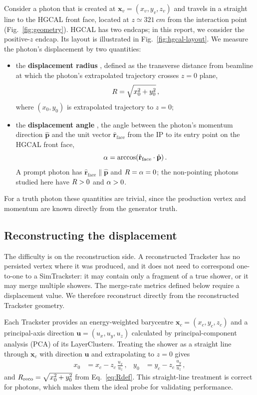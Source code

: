 Consider a photon that is created at
$\mathbf{x}_v=(x_v,y_v,z_v)$ and travels in a straight line to the HGCAL front
face, located at $z\simeq\SI{321}{cm}$ from the interaction
point (Fig.~\ref{fig:geometry}). HGCAL has two endcaps; in this report,
we consider the positive-$z$ endcap. Its layout is illustrated in
Fig.~\ref{fig:hgcal-layout}. We measure the photon's displacement by two
quantities:
\begin{itemize}
  \item the \textbf{displacement radius} \R{}, defined as the transverse
  distance from beamline at which the photon's extrapolated trajectory crosses $z=0$ plane,
  \begin{equation}
    R = \sqrt{x_0^2 + y_0^2}\,,
    \label{eq:Rdef}
  \end{equation}
  where $(x_0,y_0)$ is extrapolated trajectory to $z=0$;
  \item the \textbf{displacement angle} \alphainc{}, the angle between the
  photon's momentum direction $\hat{\mathbf{p}}$ and the unit vector
  $\hat{\mathbf{r}}_{\text{face}}$ from the IP to its entry point on the HGCAL
  front face,
  \begin{equation}
    \alpha = \arccos\!\left(
      \hat{\mathbf{r}}_{\text{face}}\cdot\hat{\mathbf{p}}
    \right).
    \label{eq:alphadef}
  \end{equation}
  A prompt photon has
  $\hat{\mathbf{r}}_{\text{face}}\parallel\hat{\mathbf{p}}$ and
  $R=\alpha=0$; the non-pointing photons studied here have $R>0$ and
  $\alpha>0$.
\end{itemize}
For a truth photon these quantities are trivial, since the
production vertex and momentum are known directly from the generator truth.

\subsection{Reconstructing the displacement}

The difficulty is on the reconstruction side. A reconstructed Trackster has no
persisted vertex where it was produced, and it does not need to correspond one-to-one to a SimTrackster: it
may contain only a fragment of a true shower, or it may merge multiple showers.
The merge-rate metrics defined below require a
displacement value. We therefore reconstruct \R{} directly from the reconstructed
Trackster geometry.

Each Trackster provides an energy-weighted barycentre
$\mathbf{x}_c=(x_c,y_c,z_c)$ and a principal-axis direction
$\mathbf{u}=(u_x,u_y,u_z)$ calculated by principal-component analysis (PCA) of
its LayerClusters. Treating the shower as a straight line through
$\mathbf{x}_c$ with direction $\mathbf{u}$ and extrapolating to $z=0$ gives
\begin{align}
  x_0 &= x_c - z_c\,\frac{u_x}{u_z}\,, &
  y_0 &= y_c - z_c\,\frac{u_y}{u_z}\,,
  \label{eq:recoR}
\end{align}
and $R_{\text{reco}}=\sqrt{x_0^2+y_0^2}$ from Eq.~\eqref{eq:Rdef}. This straight-line treatment is correct for photons, which
makes them the ideal probe for validating performance.

